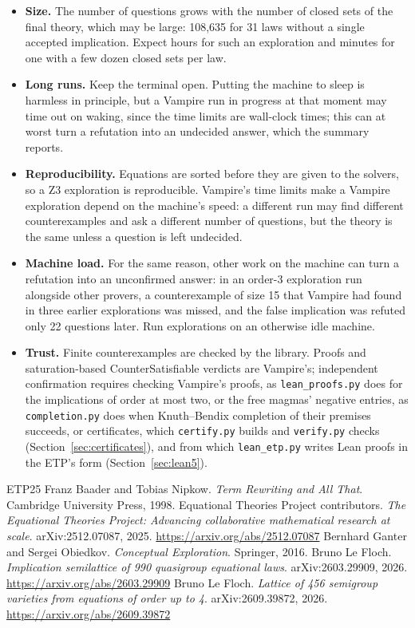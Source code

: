 \documentclass[11pt,a4paper]{article}
\theoremstyle{definition}
\theoremstyle{remark}
\newcommand{\code}[1]{\texttt{#1}}
\begin{document}
\begin{itemize}
  \item \textbf{Size.} The number of questions grows with the number of closed sets of the final theory, which may be large: 108,635 for 31 laws without a single accepted implication. Expect hours for such an exploration and minutes for one with a few dozen closed sets per law.
  \item \textbf{Long runs.} Keep the terminal open. Putting the machine to sleep is harmless in principle, but a Vampire run in progress at that moment may time out on waking, since the time limits are wall-clock times; this can at worst turn a refutation into an undecided answer, which the summary reports.
  \item \textbf{Reproducibility.} Equations are sorted before they are given to the solvers, so a Z3 exploration is reproducible. Vampire's time limits make a Vampire exploration depend on the machine's speed: a different run may find different counterexamples and ask a different number of questions, but the theory is the same unless a question is left undecided.
  \item \textbf{Machine load.} For the same reason, other work on the machine can turn a refutation into an unconfirmed answer: in an order-3 exploration run alongside other provers, a counterexample of size 15 that Vampire had found in three earlier explorations was missed, and the false implication was refuted only 22 questions later. Run explorations on an otherwise idle machine.
  \item \textbf{Trust.} Finite counterexamples are checked by the library. Proofs and saturation-based CounterSatisfiable verdicts are Vampire's; independent confirmation requires checking Vampire's proofs, as \code{lean\_proofs.py} does for the implications of order at most two, or the free magmas' negative entries, as \code{completion.py} does when Knuth--Bendix completion of their premises succeeds, or certificates, which \code{certify.py} builds and \code{verify.py} checks (Section~\ref{sec:certificates}), and from which \code{lean\_etp.py} writes Lean proofs in the ETP's form (Section~\ref{sec:lean5}).
\end{itemize}

\begin{thebibliography}{ETP25}
 Franz Baader and Tobias Nipkow. \emph{Term Rewriting and All That}. Cambridge University Press, 1998.
 Equational Theories Project contributors. \emph{The Equational Theories Project: Advancing collaborative mathematical research at scale}. arXiv:2512.07087, 2025. \url{https://arxiv.org/abs/2512.07087}
 Bernhard Ganter and Sergei Obiedkov. \emph{Conceptual Exploration}. Springer, 2016.
 Bruno Le Floch. \emph{Implication semilattice of 990 quasigroup equational laws}. arXiv:2603.29909, 2026. \url{https://arxiv.org/abs/2603.29909}
 Bruno Le Floch. \emph{Lattice of 456 semigroup varieties from equations of order up to 4}. arXiv:2609.39872, 2026. \url{https://arxiv.org/abs/2609.39872}
\end{thebibliography}
\end{document}
